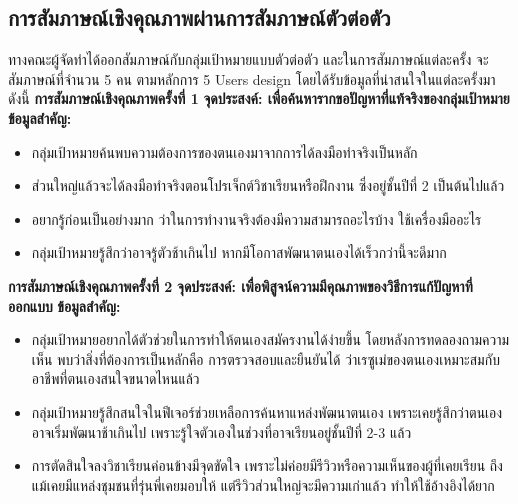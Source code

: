 \subsection{การสัมภาษณ์เชิงคุณภาพผ่านการสัมภาษณ์ตัวต่อตัว}
ทางคณะผู้จัดทำได้ออกสัมภาษณ์กับกลุ่มเป้าหมายแบบตัวต่อตัว และในการสัมภาษณ์แต่ละครั้ง จะสัมภาษณ์ที่จำนวน 5 คน ตามหลักการ 5 Users design โดยได้รับข้อมูลที่น่าสนใจในแต่ละครั้งมาดังนี้
\newline
\textbf{การสัมภาษณ์เชิงคุณภาพครั้งที่ 1}
\newline
\textbf{จุดประสงค์: เพื่อค้นหารากขอปัญหาที่แท้จริงของกลุ่มเป้าหมาย}
\newline
\textbf{ข้อมูลสำคัญ: }
\begin{itemize}
    \item กลุ่มเป้าหมายค้นพบความต้องการของตนเองมาจากการได้ลงมือทำจริงเป็นหลัก
    \item ส่วนใหญ่แล้วจะได้ลงมือทำจริงตอนโปรเจ็กต์วิชาเรียนหรือฝึกงาน ซึ่งอยู่ชั้นปีที่ 2 เป็นต้นไปแล้ว
    \item อยากรู้ก่อนเป็นอย่างมาก ว่าในการทำงานจริงต้องมีความสามารถอะไรบ้าง ใช้เครื่องมืออะไร
    \item กลุ่มเป้าหมายรู้สึกว่าอาจรู้ตัวช้าเกินไป หากมีโอกาสพัฒนาตนเองได้เร็วกว่านี้จะดีมาก
\end{itemize}


\noindent\textbf{การสัมภาษณ์เชิงคุณภาพครั้งที่ 2}
\newline
\textbf{จุดประสงค์: เพื่อพิสูจน์ความมีคุณภาพของวิธีการแก้ปัญหาที่ออกแบบ}
\newline
\textbf{ข้อมูลสำคัญ: }
\begin{itemize}
    \item กลุ่มเป้าหมายอยากได้ตัวช่วยในการทำให้ตนเองสมัครงานได้ง่ายขึ้น โดยหลังการทดลองถามความเห็น พบว่าสิ่งที่ต้องการเป็นหลักคือ การตรวจสอบและยืนยันได้ ว่าเรซูเม่ของตนเองเหมาะสมกับอาชีพที่ตนเองสนใจขนาดไหนแล้ว
    \item กลุ่มเป้าหมายรู้สึกสนใจในฟีเจอร์ช่วยเหลือการค้นหาแหล่งพัฒนาตนเอง เพราะเคยรู้สึกว่าตนเองอาจเริ่มพัฒนาช้าเกินไป เพราะรู้ใจตัวเองในช่วงที่อาจเรียนอยู่ชั้นปีที่ 2-3 แล้ว
    \item การตัดสินใจลงวิชาเรียนค่อนข้างมีจุดขัดใจ เพราะไม่ค่อยมีรีวิวหรือความเห็นของผู้ที่เคยเรียน ถึงแม้เคยมีแหล่งชุมชนที่รุ่นพี่เคยมอบให้ แต่รีวิวส่วนใหญ่จะมีความเก่าแล้ว ทำให้ใช้อ้างอิงได้ยาก
\end{itemize}



